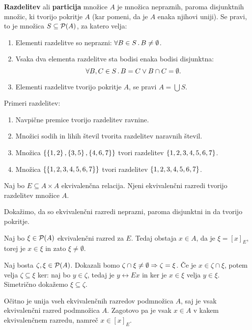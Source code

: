 \begin{definicija}
  \textbf{Razdelitev} ali \textbf{particija} množice $A$ je množica nepraznih, paroma
  disjunktnih množic, ki tvorijo pokritje $A$ (kar pomeni, da je $A$ enaka njihovi uniji). Se
  pravi, to je množica $S \subseteq \mathcal{P}(A)$, za katero velja:
  \begin{enumerate}
  \item Elementi razdelitve so neprazni: $\forall B \in S \,.\, B \neq \emptyset$.
  \item Vsaka dva elementa razdelitve sta bodisi enaka bodisi disjunktna:
    \begin{equation*}
      \forall B, C \in S \,.\, B = C \lor B \cap C = \emptyset.
    \end{equation*}
  \item Elementi razdelitve tvorijo pokritje $A$, se pravi $A = \bigcup S$.
  \end{enumerate}
\end{definicija}

\begin{primer}
  Primeri razdelitev:
  \begin{enumerate}
  \item Navpične premice tvorijo razdelitev ravnine.
  \item Množici sodih in lihih števil tvorita razdelitev naravnih števil.
  \item Množica $\left\{\left\{1,2\right\}, \left\{3,5\right\}, \left\{4,6,7\right\}\right\}$ tvori razdelitev $\left\{1,2,3,4,5,6,7\right\}$.
  \item Množica $\left\{\left\{1,2,3,4,5,6,7\right\}\right\}$ tvori razdelitev $\left\{1,2,3,4,5,6,7\right\}$.
  \end{enumerate}
\end{primer}

\begin{izrek}
  Naj bo $E \subseteq A \times A$ ekvivalenčna relacija. Njeni ekvivalenčni razredi tvorijo
  razdelitev množice $A$.
\end{izrek}

\begin{dokaz}
  Dokažimo, da so ekvivalenčni razredi neprazni, paroma disjunktni in da tvorijo pokritje.

  Naj bo $\xi \in \mathcal{P}(A)$ ekvivalenčni razred za $E$. Tedaj obstaja $x \in A$, da je $\xi = [x]_E$,
  torej je $x \in \xi$ in zato $\xi \neq \emptyset$.

  Naj bosta $\zeta, \xi \in \mathcal{P}(A)$. Dokazali bomo $\zeta \cap \xi \neq \emptyset \Rightarrow \zeta = \xi$. Če je $x \in \zeta \cap \xi$, potem velja $\zeta \subseteq \xi$ ker: naj bo $y \in \zeta$, tedaj je $y \rel{E} x$ in ker je $x \in \xi$ velja $y \in \xi$. Simetrično dokažemo $\xi \subseteq \zeta$.

  Očitno je unija vseh ekvivalenčnih razredov podmnožica $A$, saj je vsak ekvivalenčni razred podmnožica $A$. Zagotovo
  pa je vsak $x \in A$ v kakem ekvivalenčnem razredu, namreč $x \in [x]_E$.
\end{dokaz}

